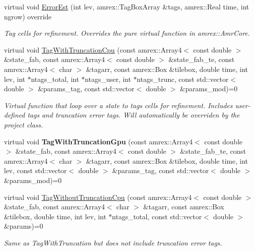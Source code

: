 \begin{DoxyCompactItemize}
virtual void \mbox{\hyperlink{classsledgehamr_1_1Sledgehamr_ae0a4a4db58d14e9bb4ef38ebc6edadb7}{Error\+Est}} (int lev, amrex\+::\+Tag\+Box\+Array \&tags, amrex\+::\+Real time, int ngrow) override
\begin{DoxyCompactList}\small\item\em Tag cells for refinement. Overrides the pure virtual function in amrex\+::\+Amr\+Core. \end{DoxyCompactList}\item 
virtual void \mbox{\hyperlink{classsledgehamr_1_1Sledgehamr_a14510bc01e24329a95ec7aa2d86ab569}{Tag\+With\+Truncation\+Cpu}} (const amrex\+::\+Array4$<$ const double $>$ \&state\+\_\+fab, const amrex\+::\+Array4$<$ const double $>$ \&state\+\_\+fab\+\_\+te, const amrex\+::\+Array4$<$ char $>$ \&tagarr, const amrex\+::\+Box \&tilebox, double time, int lev, int $\ast$ntags\+\_\+total, int $\ast$ntags\+\_\+user, int $\ast$ntags\+\_\+trunc, const std\+::vector$<$ double $>$ \&params\+\_\+tag, const std\+::vector$<$ double $>$ \&params\+\_\+mod)=0
\begin{DoxyCompactList}\small\item\em Virtual function that loop over a state to tags cells for refinement. Includes user-\/defined tags and truncation error tags. Will automatically be overriden by the project class. \end{DoxyCompactList}\item 
\mbox{\label{classsledgehamr_1_1Sledgehamr_af8129bf33797b5d3e64d415e7f9876a5}} 
virtual void {\bfseries Tag\+With\+Truncation\+Gpu} (const amrex\+::\+Array4$<$ const double $>$ \&state\+\_\+fab, const amrex\+::\+Array4$<$ const double $>$ \&state\+\_\+fab\+\_\+te, const amrex\+::\+Array4$<$ char $>$ \&tagarr, const amrex\+::\+Box \&tilebox, double time, int lev, const std\+::vector$<$ double $>$ \&params\+\_\+tag, const std\+::vector$<$ double $>$ \&params\+\_\+mod)=0
\item 
\mbox{\label{classsledgehamr_1_1Sledgehamr_a72376b1fc0e22a68c8449bccc6518897}} 
virtual void \mbox{\hyperlink{classsledgehamr_1_1Sledgehamr_a72376b1fc0e22a68c8449bccc6518897}{Tag\+Without\+Truncation\+Cpu}} (const amrex\+::\+Array4$<$ const double $>$ \&state\+\_\+fab, const amrex\+::\+Array4$<$ char $>$ \&tagarr, const amrex\+::\+Box \&tilebox, double time, int lev, int $\ast$ntags\+\_\+total, const std\+::vector$<$ double $>$ \&params)=0
\begin{DoxyCompactList}\small\item\em Same as Tag\+With\+Truncation but does not include truncation error tags. \end{DoxyCompactList}\item 

\end{DoxyCompactItemize}
